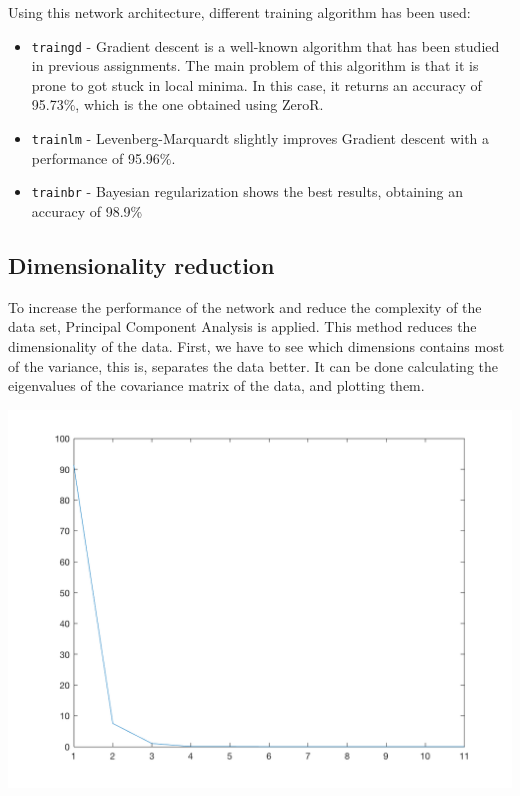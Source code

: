 \documentclass[10pt]{article}
\begin{document}
\begin{multicols}{2}
    Using this network architecture, different training algorithm has been used:

    \begin{itemize}
    \item \texttt{traingd} - Gradient descent is a well-known algorithm that
      has been studied in previous assignments. The main problem of this algorithm
      is that it is prone to got stuck in local minima. In this case, it returns an
      accuracy of 95.73\%, which is the one obtained using ZeroR.
    \item \texttt{trainlm} - Levenberg-Marquardt slightly improves Gradient descent
      with a performance of 95.96\%.
    \item \texttt{trainbr} - Bayesian regularization shows the best results,
      obtaining an accuracy of 98.9\%
    \end{itemize}

    \subsection*{Dimensionality reduction}
    To increase the performance of the network and reduce the complexity
    of the data set, Principal Component Analysis is applied. This method
    reduces the dimensionality of the data. First, we have to see
    which dimensions contains most of the variance, this is, separates the data
    better. It can be done calculating the eigenvalues of the covariance matrix
    of the data, and plotting them.

    \begin{center}
    \includegraphics[width=\linewidth]{img/variance}
    \end{center}
    


\end{multicols}
\end{document}
